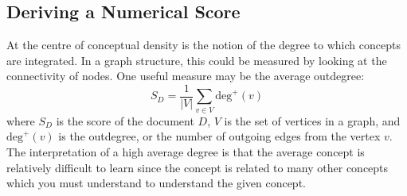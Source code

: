 \documentclass[12pt]{article}
\theoremstyle{grammarstyle}
\begin{document}

\subsection{Deriving a Numerical Score} \label{sec:quantifying_conceptual_density}
At the centre of conceptual density is the notion of the degree to which concepts are integrated. In a graph structure, this could be measured by looking at the connectivity of nodes. One useful measure may be the average outdegree:
\begin{equation} \label{eq:simple score}
    S_D = \frac{1}{|V|} \sum_{v \in V} \text{deg}^+(v)
\end{equation}
where $S_D$ is the score of the document $D$, $V$ is the set of vertices in a graph, and $\text{deg}^+(v)$ is the outdegree, or the number of outgoing edges from the vertex $v$. The interpretation of a high average degree is that the average concept is relatively difficult to learn since the concept is related to many other concepts which you must understand to understand the given concept.
\end{document}
